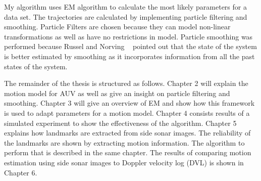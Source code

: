 \documentclass[12pt]{dalcsthesis}
\begin{document}
My algorithm uses EM algorithm to calculate the most likely parameters for a data set.  The trajectories are calculated by implementing particle filtering and smoothing.  Particle Filters are chosen because they can model non-linear transformations as well as have no restrictions in model. Particle smoothing was performed because Russel and Norving ~\cite{russell2003artificial} pointed out that the state of the system is better estimated by smoothing as it incorporates information from all the past states of the system. 

The remainder of the thesis is structured as follows. Chapter 2 will explain the motion model for AUV as well as give an insight on particle filtering and smoothing. Chapter 3 will give an overview of EM and show how this framework is used to adapt parameters for a motion model. Chapter 4 consists results of a simulated experiment to show the effectiveness of the algorithm. Chapter 5 explains how landmarks are extracted from side sonar images. The reliability of the landmarks are shown by extracting motion information. The algorithm to perform that is described in the same chapter. The results of comparing motion estimation using side sonar images to Doppler velocity log (DVL) is shown in Chapter 6.
 
\end{document}
